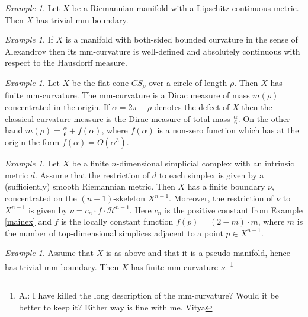 \documentclass[12pt,leqno,intlimits]{amsart}
\numberwithin{equation}{section}
\theoremstyle{definition}
\theoremstyle{remark}
\newtheorem{ex}[thm]{Example}
\begin{document}
\begin{ex}
Let $X$ be a Riemannian manifold with a Lipschitz continuous metric.
Then $X$ has  trivial mm-boundary.
\end{ex}


 \begin{ex}
  If $X$ is a manifold with  both-sided bounded curvature in the sense of Alexandrov then its
  mm-curvature   is  well-defined and  absolutely continuous with respect to the Hausdorff measure.
 \end{ex}




\begin{ex} \label{ex:cone}
 Let $X$ be the flat cone $CS_{\rho}$ over a circle of length $\rho$.
  Then $X$ has finite mm-curvature. The mm-curvature is a Dirac measure of mass $m(\rho)$ concentrated in the origin.
  If $\alpha =2\pi-\rho$ denotes the defect of $X$ then the classical curvature measure is the Dirac measure of total mass
  $\frac \alpha 6$.  On the other hand $m(\rho)= \frac \alpha 6 + f(\alpha)$, where
  $f(\alpha)$ is a non-zero function which has at the origin the form $f(\alpha)= O(\alpha ^3)$.
   \end{ex}




 \begin{ex}
 Let $X$ be a finite $n$-dimensional simplicial complex with an intrinsic metric $d$.
 Assume that the restriction of $d$ to each simplex is given by a (sufficiently) smooth Riemannian metric.
 Then $X$ has a finite boundary $\nu$, concentrated on  the $(n-1)$-skeleton $X^{n-1}$.
 Moreover, the restriction of $\nu $ to
 $X^{n-1}$ is given by $\nu= c_n \cdot f \cdot \mathcal H ^{n-1}$.
 Here $c_n$ is the positive constant from Example  \ref{mainex} and  $f$ is the locally constant function $f(p)=(2-m)\cdot m$, where $m$ is the number of top-dimensional simplices
 adjacent to a point $p\in X^{n-1}$.
 \end{ex}


 \begin{ex}
 Assume that $X$ is as above  and that it  is a pseudo-manifold, hence has trivial mm-boundary.
Then $X$ has finite mm-curvature $\nu$. \footnote{A.: I have killed the long description of the mm-curvature?  Would it be better to keep it? {\color{red} Either way is fine with me. Vitya}}
 \end{ex}
\end{document}
